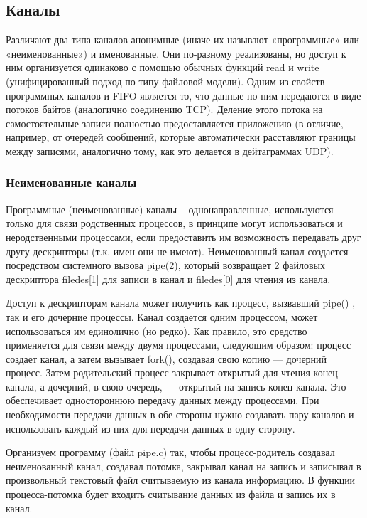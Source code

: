 \documentclass[a4paper]{article}
\begin{document}
\subsection{Каналы}
	Различают два типа каналов анонимные (иначе их называют «программные» или «неименованные») и именованные. Они по-разному реализованы, но доступ к ним организуется одинаково с помощью обычных функций read и write (унифицированный подход по типу файловой модели). Одним из свойств программных каналов и FIFO является то, что данные по ним передаются в виде потоков байтов (аналогично соединению TCP). Деление этого потока на самостоятельные записи полностью предоставляется приложению (в отличие, например, от очередей сообщений, которые автоматически расставляют границы между записями, аналогично тому, как это делается в дейтаграммах UDP).
		
	\subsubsection{Неименованные каналы}
	Программные (неименованные) каналы – однонаправленные, используются только для связи родственных процессов, в принципе могут использоваться и неродственными процессами, если предоставить им возможность передавать друг другу дескрипторы (т.к. имен они не имеют). Неименованный канал создается посредством системного вызова pipe(2), который возвращает 2 файловых дескриптора filedes[1] для записи в канал и filedes[0] для чтения из канала.
	
	Доступ к дескрипторам канала может получить как процесс, вызвавший pipe() , так и его дочерние процессы. Канал создается одним процессом, может использоваться им единолично (но редко). Как правило, это средство применяется для связи между двумя процессами, следующим образом: процесс создает канал, а затем вызывает fork(), создавая свою копию — дочерний процесс. Затем родительский процесс закрывает открытый для чтения конец канала, а дочерний, в свою очередь, — открытый на запись конец канала. Это обеспечивает одностороннюю передачу данных между процессами. При необходимости передачи данных в обе стороны нужно создавать пару каналов и использовать каждый из них для передачи данных в одну сторону.
	
	Организуем программу (файл pipe.c) так, чтобы процесс-родитель создавал неименованный канал, создавал потомка, закрывал канал на запись и записывал в произвольный текстовый файл считываемую из канала информацию. В функции процесса-потомка будет входить считывание данных из файла и запись их в канал.
	
\end{document}
